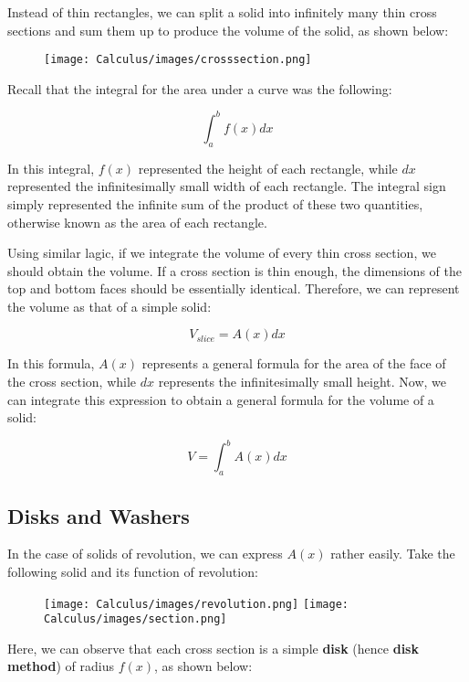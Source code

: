 \documentclass[11pt]{article}
\begin{document}
Instead of thin rectangles, we can split a solid into infinitely many thin cross sections and sum them up to produce the volume of the solid, as shown below: 

\begin{figure}[H]
    \centering
    \texttt{[image: Calculus/images/crosssection.png]}
\end{figure}

Recall that the integral for the area under a curve was the following:

\[ \int_{a}^{b} f(x) dx \]

In this integral, $f(x)$ represented the height of each rectangle, while $dx$ represented the infinitesimally small width of each rectangle. The integral sign simply represented the infinite sum of the product of these two quantities, otherwise known as the area of each rectangle. 

Using similar lagic, if we integrate the volume of every thin cross section, we should obtain the volume. If a cross section is thin enough, the dimensions of the top and bottom faces should be essentially identical. Therefore, we can represent the volume as that of a simple solid:

\[ V_{\textit{slice}} = A(x) dx \]

In this formula, $A(x)$ represents a general formula for the area of the face of the cross section, while $dx$ represents the infinitesimally small height. Now, we can integrate this expression to obtain a general formula for the volume of a solid:

\[ V = \int_{a}^{b} A(x) dx \]

\subsection{Disks and Washers}
In the case of solids of revolution, we can express $A(x)$ rather easily. Take the following solid and its function of revolution:

\begin{figure}[H]
    \hspace*{2cm}
    \texttt{[image: Calculus/images/revolution.png]}
    \hspace*{2cm}
    \texttt{[image: Calculus/images/section.png]}
\end{figure}

Here, we can observe that each cross section is a simple \textbf{disk} (hence \textbf{disk method}) of radius $f(x)$, as shown below:
\end{document}
